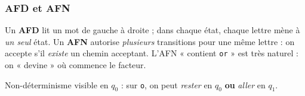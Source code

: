 \documentclass[11pt,a4paper]{scrartcl}
\begin{document}
\subsubsection{AFD et AFN}
Un \textbf{AFD} lit un mot de gauche à droite ; dans chaque état, chaque lettre mène à
\emph{un seul} état. Un \textbf{AFN} autorise \emph{plusieurs} transitions pour une même
lettre : on accepte s'il \emph{existe} un chemin acceptant. L'AFN « contient \texttt{or} »
est très naturel : on « devine » où commence le facteur.
\begin{center}
\end{center}
\noindent Non-déterminisme visible en $q_0$ : sur \texttt{o}, on peut \emph{rester} en
$q_0$ \textbf{ou} \emph{aller} en $q_1$.
\end{document}
